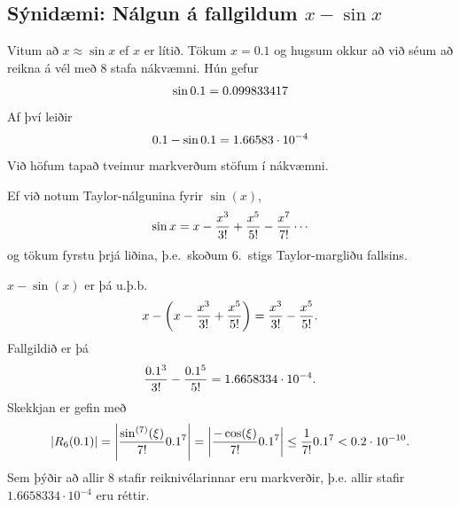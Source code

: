 \documentclass[letterpaper,10pt,icelandic]{sphinxmanual}
\begin{document}
\subsection{Sýnidæmi: Nálgun á fallgildum \(x-\sin x\)}
\label{kafli01:synidaemi-nalgun-a-fallgildum}
Vitum að \(x \approx \sin x\) ef \(x\) er lítið. Tökum
\(x=0.1\) og hugsum okkur að við séum að reikna á vél með 8 stafa
nákvæmni. Hún gefur
\begin{gather}
\begin{split}\sin 0.1 = 0.099833417\end{split}\notag
\end{gather}
Af því leiðir
\begin{gather}
\begin{split}0.1 - \sin 0.1 = 1.66583\cdot 10^{-4}\end{split}\notag
\end{gather}
Við höfum tapað tveimur markverðum stöfum í nákvæmni.

Ef við notum Taylor-nálgunina fyrir \(\sin(x)\),
\begin{gather}
\begin{split}\sin x = x - \frac{x^3}{3!} + \frac{x^5}{5!}
    - \frac{x^7}{7!} \cdots\end{split}\notag
\end{gather}
og tökum fyrstu þrjá liðina, þ.e. skoðum 6. stigs Taylor-margliðu
fallsins.

\(x-\sin(x)\) er þá u.þ.b.
\begin{gather}
\begin{split}x - \left(x - \frac{x^3}{3!} + \frac{x^5}{5!}\right) = \frac{x^3}{3!} - \frac{x^5}{5!}.\end{split}\notag
\end{gather}
Fallgildið er þá
\begin{gather}
\begin{split}\frac {0.1^3}{3!} - \frac{0.1^5}{5!} = 1.6658334 \cdot 10^{-4}.\end{split}\notag
\end{gather}
Skekkjan er gefin með
\begin{gather}
\begin{split}|R_6(0.1)| = \left|\frac{\sin^{(7)}(\xi)}{7!}0.1^7\right|
    = \left|\frac{-\cos(\xi)}{7!}0.1^7\right|
    \leq \frac{1}{7!}0.1^7 < 0.2\cdot 10^{-10}.\end{split}\notag
\end{gather}
Sem þýðir að allir 8 stafir reiknivélarinnar eru markverðir, þ.e.
allir stafir \(1.6658334 \cdot 10^{-4}\) eru réttir.
\end{document}
